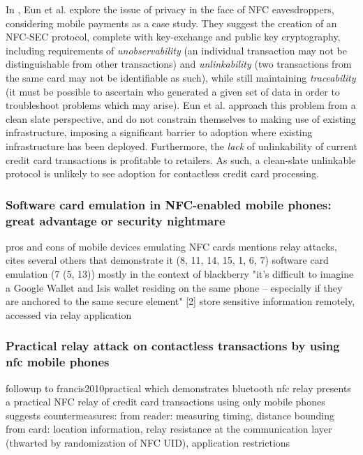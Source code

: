 In \cite{eun2013conditional}, Eun et al. explore the issue of privacy in the face of NFC eavesdroppers, considering mobile payments as a case study.
They suggest the creation of an NFC-SEC protocol, complete with key-exchange and public key cryptography, including requirements of
    \emph{unobservability} (an individual transaction may not be distinguishable from other transactions) and
    \emph{unlinkability} (two transactions from the same card may not be identifiable as such), while still maintaining
    \emph{traceability} (it must be possible to ascertain who generated a given set of data in order to troubleshoot problems which may arise).
Eun et al. approach this problem from a clean slate perspective, and do not constrain themselves to making use of existing infrastructure,
    imposing a significant barrier to adoption where existing infrastructure has been deployed.
Furthermore, the \emph{lack} of unlinkability of current credit card transactions is profitable to retailers.
As such, a clean-slate unlinkable protocol is unlikely to see adoption for contactless credit card processing.



\subsubsection*{Software card emulation in NFC-enabled mobile phones: great advantage or security nightmare}
\cite{roland2012software}
pros and cons of mobile devices emulating NFC cards
mentions relay attacks, cites several others that demonstrate it (8, 11, 14, 15, 1, 6, 7)
software card emulation (7 (5, 13)) mostly in the context of blackberry
"it's difficult to imagine a Google Wallet and Isis wallet residing on the same phone -- especially if they are anchored to the same secure element" [2]
store sensitive information remotely, accessed via relay application

\subsubsection*{Practical relay attack on contactless transactions by using nfc mobile phones}
\cite{markantonakis2012practical}
followup to francis2010practical which demonstrates bluetooth nfc relay
presents a practical NFC relay of credit card transactions using only mobile phones
suggests countermeasures:
  from reader: measuring timing, distance bounding
  from card: location information, relay resistance at the communication layer (thwarted by randomization of NFC UID), application restrictions


